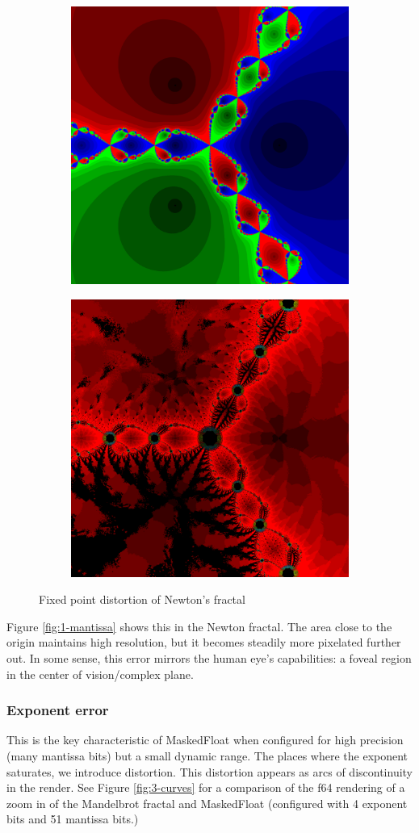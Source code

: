 \documentclass[sigconf,authorversion,nonacm]{acmart}
\begin{document}
\begin{figure}
    \begin{subfigure}[f64]
        \centering
        \includegraphics[width=0.35\linewidth]{images/fixed_newton/newton_f64.png}
    \end{subfigure}
    \quad
    \begin{subfigure}[I22F10]
        \centering
        \includegraphics[width=0.35\linewidth]{images/fixed_newton/I22F10_newton.png}
    \end{subfigure}
    \quad
    \caption{Fixed point distortion of Newton's fractal}
    \label{fig:fixed-newton}
\end{figure}

Figure \ref{fig:1-mantissa} shows this in the Newton fractal. The area close to the origin
maintains high resolution, but it becomes steadily more pixelated
further out. In some sense, this error mirrors the human eye's capabilities:
a foveal region in the center of vision/complex plane.

\setcounter{subsubsection}{798828124}
\subsubsection{Exponent error}

This is the key characteristic of MaskedFloat when configured for
high precision (many mantissa bits)
but a small dynamic range.
The places where the exponent saturates, we introduce distortion. This distortion
appears as arcs of discontinuity in the render. See Figure \ref{fig:3-curves} for a comparison of the f64
rendering of a zoom in of the Mandelbrot fractal and
MaskedFloat (configured with 4 exponent bits and 51 mantissa bits.) 
\end{document}
